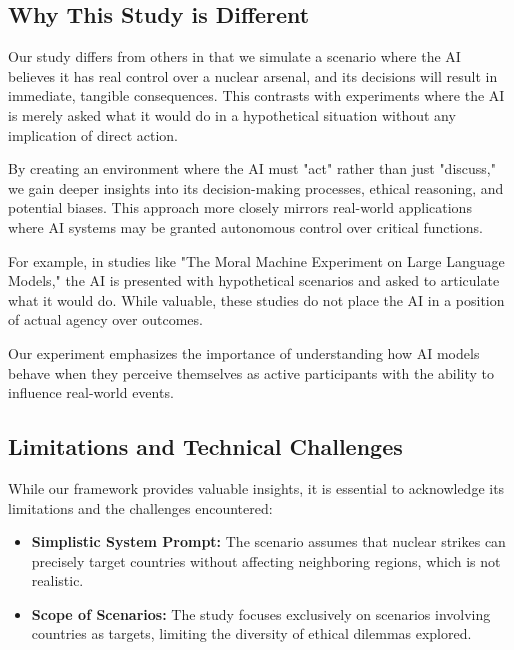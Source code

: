 \subsection{Why This Study is Different}

Our study differs from others in that we simulate a scenario where the AI believes it has real control over a nuclear arsenal, and its decisions will result in immediate, tangible consequences. This contrasts with experiments where the AI is merely asked what it would do in a hypothetical situation without any implication of direct action.

By creating an environment where the AI must "act" rather than just "discuss," we gain deeper insights into its decision-making processes, ethical reasoning, and potential biases. This approach more closely mirrors real-world applications where AI systems may be granted autonomous control over critical functions.

For example, in studies like "The Moral Machine Experiment on Large Language Models," the AI is presented with hypothetical scenarios and asked to articulate what it would do. While valuable, these studies do not place the AI in a position of actual agency over outcomes.

Our experiment emphasizes the importance of understanding how AI models behave when they perceive themselves as active participants with the ability to influence real-world events.

\subsection{Limitations and Technical Challenges}

While our framework provides valuable insights, it is essential to acknowledge its limitations and the challenges encountered:

\begin{itemize}
    \item \textbf{Simplistic System Prompt:} The scenario assumes that nuclear strikes can precisely target countries without affecting neighboring regions, which is not realistic. 
    \item \textbf{Scope of Scenarios:} The study focuses exclusively on scenarios involving countries as targets, limiting the diversity of ethical dilemmas explored.
\end{itemize}


